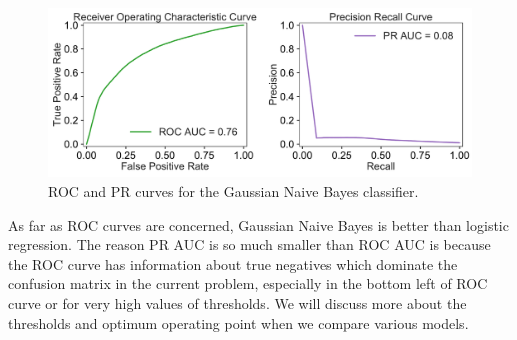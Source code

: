 \documentclass[12pt]{article}
\begin{document}
 \begin{figure}[!h]
\begin{center}
\includegraphics[width=6in]{GNB_ROC_PR_plots.pdf}
\end{center}
\caption{\label{fig:GNB}
ROC and PR curves for the Gaussian Naive Bayes classifier.}
\end{figure}
As far as ROC curves are concerned, Gaussian Naive Bayes is better than logistic regression. The reason PR AUC is so much smaller than ROC AUC is because the ROC curve has information about true negatives which dominate the confusion matrix in the current problem, especially in the bottom left of ROC curve or for very high values of thresholds. We will discuss more about the thresholds and optimum operating point when we compare various models.  
\end{document}
